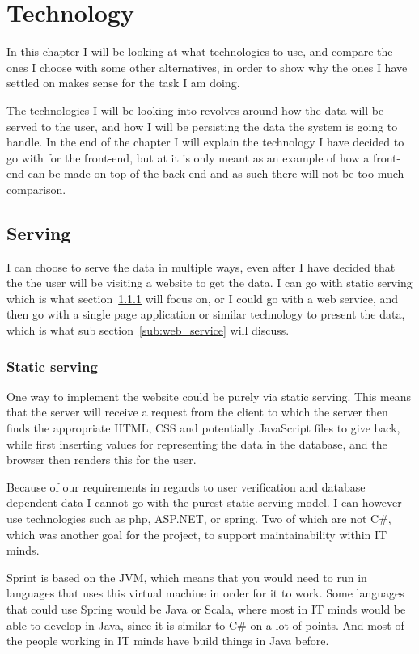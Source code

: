 \chapter{Technology}
\label{chap:Technology}
In this chapter I will be looking at what technologies to use, and compare the
ones I choose with some other alternatives, in order to show why the ones I have
settled on makes sense for the task I am doing. 

The technologies I will be looking into revolves around how the data will be
served to the user, and how I will be persisting the data the system is going to
handle. In the end of the chapter I will explain the technology I have decided
to go with for the front-end, but at it is only meant as an example of how a
front-end can be made on top of the back-end and as such there will not be too
much comparison.

\section{Serving}
\label{sec:Serving}
I can choose to serve the data in multiple ways, even after I have decided that
the the user will be visiting a website to get the data. I can go with static
serving which is what section~\ref{sub:Static_serving} will focus on, or I
could go with a web service, and then go with a single page application or
similar technology to present the data, which is what sub
section~\ref{sub:web_service} will discuss.

\subsection{Static serving}
\label{sub:Static_serving}

One way to implement the website could be purely via static serving. This means
that the server will receive a request from the client to which the server then
finds the appropriate HTML, CSS and potentially JavaScript files to give back,
while first inserting values for representing the data in the database, and the
browser then renders this for the user. 

Because of our requirements in regards to user verification and database
dependent data I cannot go with the purest static serving model. I can however
use technologies such as php, ASP.NET, or spring. Two of which are not C\#,
which was another goal for the project, to support maintainability within IT
minds. 

Sprint is based on the JVM\cite{spring-framework}, which means that you would need to run in languages that uses this virtual machine in order for it to work. Some languages that could use Spring would be Java or Scala, where most in IT minds would be able to develop in Java, since it is similar to C\# on a lot of points. And most of the people working in IT minds have build things in Java before.

